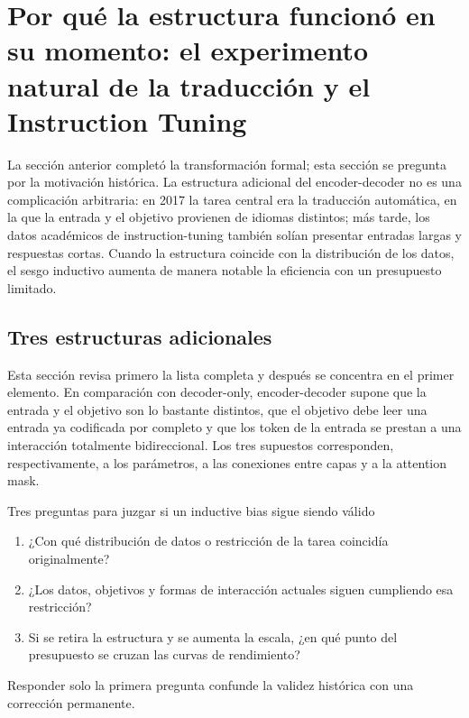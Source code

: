 \section{Por qué la estructura funcionó en su momento: el experimento natural de la traducción y el Instruction Tuning}

La sección anterior completó la transformación formal; esta sección se pregunta por la motivación histórica. La estructura adicional del encoder-decoder no es una complicación arbitraria: en 2017 la tarea central era la traducción automática, en la que la entrada y el objetivo provienen de idiomas distintos; más tarde, los datos académicos de instruction-tuning también solían presentar entradas largas y respuestas cortas. Cuando la estructura coincide con la distribución de los datos, el sesgo inductivo aumenta de manera notable la eficiencia con un presupuesto limitado.

\subsection{Tres estructuras adicionales}

Esta sección revisa primero la lista completa y después se concentra en el primer elemento. En comparación con decoder-only, encoder-decoder supone que la entrada y el objetivo son lo bastante distintos, que el objetivo debe leer una entrada ya codificada por completo y que los token de la entrada se prestan a una interacción totalmente bidireccional. Los tres supuestos corresponden, respectivamente, a los parámetros, a las conexiones entre capas y a la attention mask.



\begin{importantbox}{Tres preguntas para juzgar si un inductive bias sigue siendo válido}
\begin{enumerate}
  \item ¿Con qué distribución de datos o restricción de la tarea coincidía originalmente?
  \item ¿Los datos, objetivos y formas de interacción actuales siguen cumpliendo esa restricción?
  \item Si se retira la estructura y se aumenta la escala, ¿en qué punto del presupuesto se cruzan las curvas de rendimiento?
\end{enumerate}
Responder solo la primera pregunta confunde la validez histórica con una corrección permanente.
\end{importantbox}

